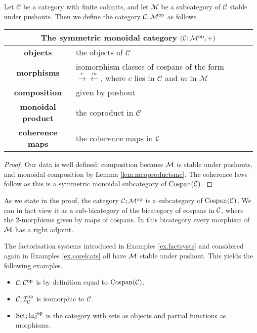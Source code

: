 \begin{proposition}
  Let $\mathcal C$ be a category with finite colimits, and let $\mathcal M$ be a
  subcategory of $\mathcal C$ stable under pushouts. Then we define the category
  $\mathcal C; \mathcal M^{\mathrm{op}}$ as follows  
  \smallskip 

  \begin{center}
    \begin{tabular}{| c | p{} |}
      \hline
      \multicolumn{2}{|c|}{The symmetric monoidal category $(\mathcal C;\mathcal M^{\mathrm{op}},+)$} \\
      \hline
      \textbf{objects} & the objects of $\mathcal C$ \\ 
      \textbf{morphisms} & isomorphism classes of cospans of the form
      $\stackrel{c}\rightarrow \stackrel{m}\leftarrow$, where $c$ lies in
      $\mathcal C$ and $m$ in $\mathcal M$\\ 
      \textbf{composition} & given by pushout \\
      \textbf{monoidal product} & the coproduct in $\mathcal C$ \\
      \textbf{coherence maps} & the coherence maps in $\mathcal C$ \\
      \hline
    \end{tabular}
  \end{center}
  \smallskip 
\end{proposition}

\begin{proof}
  Our data is well defined: composition because $\mathcal M$ is stable under
  pushouts, and monoidal composition by Lemma \ref{lem.mcoproductsmc}. The
  coherence laws follow as this is a symmetric monoidal subcategory of
  $\operatorname{{Cospan}}(\mathcal C)$. 
\end{proof}

As we state in the proof, the category $\mathcal C;\mathcal M^{\mathrm{op}}$ is a subcategory of
$\operatorname{{Cospan}}(\mathcal C)$. We can in fact view it as a sub-bicategory of the bicategory
of cospans in $\mathcal C$, where the 2-morphisms given by maps of cospans. In this
bicategory every morphism of $\mathcal M$ has a right adjoint.

\begin{examples} 
  The factorisation systems introduced in Examples \ref{ex.factsysts} and
  considered again in Examples \ref{ex.corelcats} all have $\mathcal M$ stable under
  pushout. This yields the following examples.
  \begin{itemize}
    \item $\mathcal C; \mathcal C^{\mathrm{op}}$ is by definition equal to
      $\operatorname{{Cospan}}(\mathcal C)$.
    \item $\mathcal C;\mathcal I_{\mathcal C}^{\mathrm{op}}$ is isomorphic to $\mathcal C$.
    \item $\mathrm{Set};\mathrm{Inj}^{\mathrm{op}}$ is the category with sets as objects and partial
      functions as morphisms.
  \end{itemize}
\end{examples}

